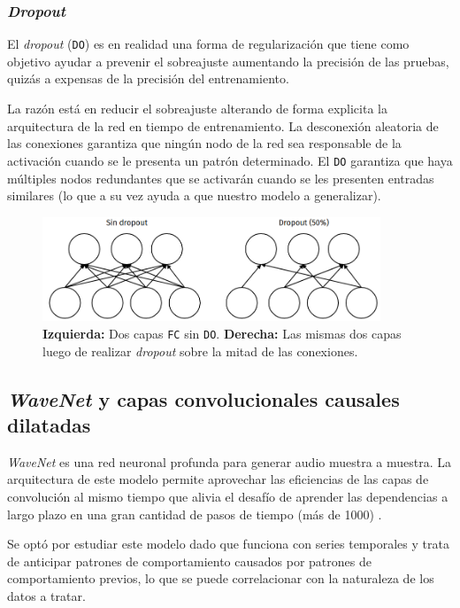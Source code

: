 \documentclass[a4paper,12pt]{article}
\begin{document}
\subsubsection{\textit{Dropout}}
El \textit{dropout} (\texttt{DO}) es en realidad una forma de regularización que tiene como objetivo ayudar a prevenir el sobreajuste aumentando la precisión de las pruebas, quizás a expensas de la precisión del entrenamiento. \citep{rosebrock2017deep}

La razón está en reducir el sobreajuste alterando de forma explicita la arquitectura de la red en tiempo de entrenamiento. La desconexión aleatoria de las conexiones garantiza que ningún nodo de la red sea responsable de la activación cuando se le presenta un patrón determinado. El \texttt{DO} garantiza que haya múltiples nodos redundantes que se activarán cuando se les presenten entradas similares (lo que a su vez ayuda a que nuestro modelo a generalizar).

\begin{figure}[H]
	\begin{center}
		\includegraphics[width=0.9\textwidth]{tesis_46.png}
		\caption{\textbf{Izquierda:} Dos capas \texttt{FC} sin \texttt{DO}. \textbf{Derecha:} Las mismas dos capas luego de realizar \textit{dropout} sobre la mitad de las conexiones.}
		\label{fig:type-pooling}
	\end{center}
\end{figure}

\subsection{\textit{WaveNet} y capas convolucionales causales dilatadas}

\textit{WaveNet} es una red neuronal profunda para generar audio muestra a muestra. La arquitectura de este modelo permite aprovechar las eficiencias de las capas de convolución al mismo tiempo que alivia el desafío de aprender las dependencias a largo plazo en una gran cantidad de pasos de tiempo (más de 1000) \citep{wavenet2}.

Se optó por estudiar este modelo dado que funciona con series temporales y trata de anticipar patrones de comportamiento causados por patrones de comportamiento previos, lo que se puede correlacionar con la naturaleza de los datos a tratar.
\end{document}
